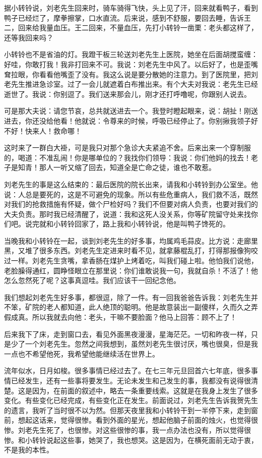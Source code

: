 据小转铃说，刘老先生回来时，骑车骑得飞快，头上见了汗，回来就看鸭子，看到鸭子已经烂了，摩拳擦掌，口水直流。后来说，感到不舒服，要回去睡，告诉王二，回来给我量血压。王二回来，不量血压，先打小转铃一凿栗：老头都这样了，还等我回来吗？ 

小转铃也不是省油的灯。我蹬干板三轮送刘老先生上医院，她坐在后面胡搅蛮缠：好哇，你敢打我！我非打回来不可。我说：刘老先生中风了。以后好了，也是歪嘴耷拉眼，你看看他嘴歪了没有。我这么说是要分散她的注意力。到了医院里，把刘老先生推进急诊室。过了一会儿就遮着白布推出来。有个大夫对我说：老先生已经逝世了。我说：你别逗了。我们送来那会儿，刚才还打呼噜呢，你跟别人说去。 


可是那大夫说：请您节哀，总共就送进去一个。我登时瞪起眼来，说：胡扯！刚送进去，你还没给他看！他就说：令尊来的时候，呼吸已经停止了。你别揪我领子好不好！快来人！救命哪！ 

这时来了一群白大褂，可是我只对那个急诊大夫紧追不舍。后来出来一个穿制服的，喝道：不准乱闹！你是哪单位的？我找你们领导：我说：你们他妈的找去！老子是知青！那人一听又缩了回去，知道全是亡命之徒，谁也不敢惹。 

刘老先生的事是这么结束的：最后医院的院长出来，请我和小转铃到办公室坐。他说：人总是要死的，这是不可避免的现象。所以有些危重病人，我们救不活，既然对我们的抢救措施有怀疑，做个尸检好吗？我们不但要对病人负责，也要对我们的大夫负责。那时我已经清醒了，说道：我和这死人没关系，你等矿院留守处来找你们吧。说完就和小转铃回家了，路上我和小转铃说，他是叫鸭子馋死的。 

当晚我和小转铃在一起，谈到刘老先生的好多事，均属鸡毛蒜皮。比方说：走廊里黑，又堆了很多东西。刘老先生定进来时看不见，就拿藤棍乱打，打得那报像狗咬过一样。刘老先生贪嘴，拿香肠在煤护上烤着吃，叫我们碰上啦。他怕我们说他，老脸臊得通红，圆睁怪眼立在那里说：你们谁敢说我一句，我就自杀！不活了！他怎么忽然死了呢？这事真逗哇。我们应该干一回纪念他。 

我们想起刘老先生好多事，都很逗，除了一件。有一回我爸爸告诉我：刘老先生并不笨，矿院的老人都知道，此人绝顶的聪明。他是故意装出一副傻样，久而久之弄假成真。所以我就去向他：老头，干嘛不要脸面？他马上回答：顾不上了！ 

后来我下了床，走到窗口去，看见外面黑夜漫漫，星海茫茫。一切和昨夜一样，只是少了一个刘老先生。忽然之间我想到，虽然刘老先生很讨厌，嘴也很臭，但是我一点也不希望他死，我希望他能继续活在世界上。 

流年似水，日月如梭。很多事情已经过去了。在七三年元旦回首六七年底，很多事情已经发生，还有一些事将要发生。无论未发生和己发生的事，我都没有说得很清楚。这是因为，在前面的叙述中，略去一条重要线索。这就是在我身上发生了很多变化。有些变化已经完成，有些变化正在发生。前面说过，刘老先生告诉我贺先生的遗言，我听了当时很不以为然。但那天夜里我和小转铃干到一半停下来，走到窗前，想起这话来，觉得很惨。看到外面的星光，想起他脑子前面的烛火，也觉得很惨。刘老先生死了，也很惨。对这些很惨的事，我一点办法也没有，所以觉得很惨。和小转铃说起这些事，她哭了，我也想哭。这是因为，在横死面前无动于衷，不是我的本性。 

